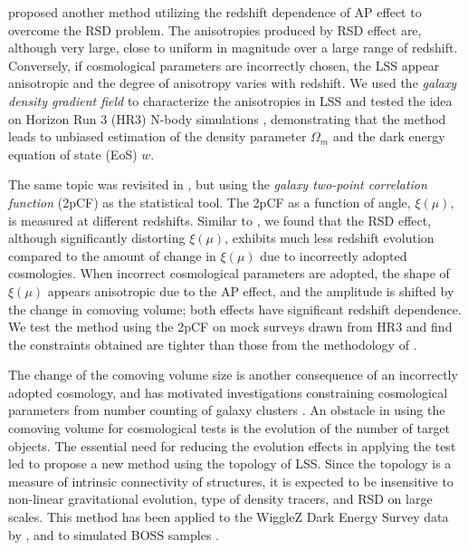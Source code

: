 \documentclass[iop]{emulateapj}
\begin{document}
\cite{Li2014} proposed another method utilizing the redshift dependence of AP effect to overcome the RSD problem.
The anisotropies produced by RSD effect are, although very large,
close to uniform in magnitude over a large range of redshift.
Conversely, if cosmological parameters are incorrectly chosen, the LSS
appear anisotropic and the degree of anisotropy varies with redshift. 
We used the {\it galaxy density gradient field} 
to characterize the anisotropies in LSS and tested the idea on Horizon Run 3 (HR3) N-body simulations \citep{horizonrun},
demonstrating that the method leads to unbiased estimation of the density parameter $\Omega_m$ and the dark energy equation of state (EoS) $w$.

The same topic was revisited in \cite{Li2015}, but using the {\it galaxy two-point correlation function} (2pCF) as the statistical tool.
The 2pCF as a function of angle, $\xi(\mu)$, is measured at different redshifts.
Similar to \cite{Li2014}, we found that the RSD effect, although significantly distorting $\xi(\mu)$, 
exhibits much less redshift evolution compared to the amount of change in $\xi(\mu)$ due to incorrectly adopted cosmologies.
When incorrect cosmological parameters are adopted, 
the shape of $\xi(\mu)$ appears anisotropic due to the AP effect, 
and the amplitude is shifted by the change in comoving volume;
both effects have significant redshift dependence.
We test the method using the 2pCF on mock surveys drawn from HR3
and find the constraints obtained are tighter than those from the methodology of \cite{Li2014}.

The change of the comoving volume size is another consequence of an incorrectly adopted cosmology, 
and has motivated investigations constraining cosmological parameters from number counting of 
galaxy clusters \citep{PS1974,VL1996}. 
An obstacle in using the comoving volume for cosmological tests is the evolution of the number of target objects.
The essential need for reducing the evolution effects in applying the test led \cite{topology} to propose a new method
using the topology of LSS. 
Since the topology is a measure of intrinsic connectivity of structures,
it is expected to be insensitive to non-linear gravitational evolution, type of density tracers,
and RSD on large scales.
This method has been applied to the WiggleZ Dark Energy Survey data by \cite{WiggleZtopoloy},
and to simulated BOSS samples \citep{Speare2015}.
\end{document}
